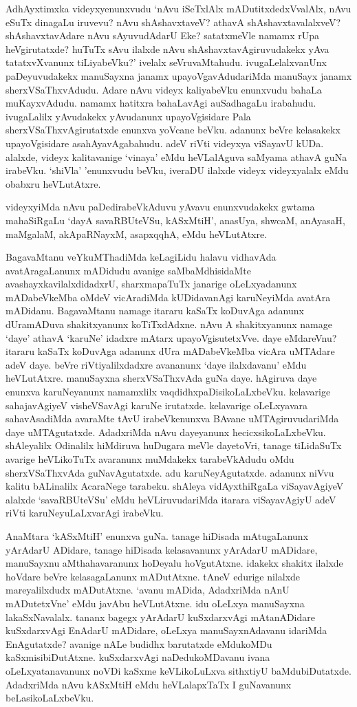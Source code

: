 AdhAyxtimxka videyxyenunxvudu `nAvu iSeTxlAlx mADutitxdedxVvalAlx, nAvu eSuTx dinagaLu iruvevu? nAvu shAshavxtaveV? athavA shAshavxtavalalxveV? shAshavxtavAdare 
nAvu sAyuvudAdarU Eke? satatxmeVle namamx rUpa heVgirutatxde? huTuTx sAvu ilalxde nAvu shAshavxtavAgiruvudakekx yAva 
tatatxvXvanunx tiLiyabeVku?' ivelalx seVruvaMtahudu. ivugaLelalxvanUnx paDeyuvudakekx manuSayxna janamx upayoVgavAdudariMda manuSayx 
janamx sherxVSaThxvAdudu. Adare nAvu videyx kaliyabeVku enunxvudu bahaLa muKayxvAdudu. namamx hatitxra bahaLavAgi auSadhagaLu irabahudu. 
ivugaLalilx yAvudakekx yAvudanunx upayoVgisidare Pala sherxVSaThxvAgirutatxde enunxva yoVcane beVku. adanunx beVre kelasakekx upayoVgisidare 
asahAyavAgabahudu. adeV riVti videyxya viSayavU kUDa. alalxde, videyx kalitavanige `vinaya' eMdu heVLalAguva saMyama athavA 
guNa irabeVku. `shiVla' 'enunxvudu beVku, iveraDU ilalxde videyx videyxyalalx eMdu obabxru heVLutAtxre.

videyxyiMda nAvu paDedirabeVkAduvu yAvavu enunxvudakekx gwtama mahaSiRgaLu `dayA savaRBUteVSu, kASxMtiH', anasUya, shwcaM, 
anAyasaH, maMgalaM, akApaRNayxM, asapxqqhA, eMdu heVLutAtxre.

BagavaMtanu veYkuMThadiMda keLagiLidu halavu vidhavAda avatAragaLanunx mADidudu avanige saMbaMdhisidaMte avashayxkavilalxdidadxrU, sharxmapaTuTx janarige 
oLeLxyadanunx mADabeVkeMba oMdeV vicAradiMda kUDidavanAgi karuNeyiMda avatAra mADidanu. BagavaMtanu namage itararu kaSaTx 
koDuvAga adanunx dUramADuva shakitxyanunx koTiTxdAdxne. nAvu A shakitxyanunx namage `daye' athavA `karuNe' idadxre mAtarx upayoVgisutetxVve. daye 
eMdareVnu? itararu kaSaTx koDuvAga adanunx dUra mADabeVkeMba vicAra uMTAdare adeV daye. beVre riVtiyalilxdadxre avananunx `daye ilalxdavanu' eMdu 
heVLutAtxre. manuSayxna sherxVSaThxvAda guNa daye. hAgiruva daye enunxva karuNeyanunx namamxlilx vaqdidhxpaDisikoLaLxbeVku. kelavarige sahajavAgiyeV 
visheVSavAgi karuNe irutatxde. kelavarige oLeLxyavara sahavAsadiMda avaraMte tAvU irabeVkenunxva BAvane uMTAgiruvudariMda daye 
uMTAgutatxde. AdadxriMda nAvu dayeyanunx hecicxsikoLaLxbeVku. shAleyalilx Odinalilx hiMdiruva huDugara meVle dayetoVri, tanage tiLidaSuTx 
avarige heVLikoTuTx avaranunx muMdakekx tarabeVkAdudu oMdu sherxVSaThxvAda guNavAgutatxde. adu karuNeyAgutatxde. adanunx niVvu kalitu bALinalilx 
AcaraNege tarabeku. shAleya vidAyxthiRgaLa viSayavAgiyeV alalxde `savaRBUteVSu' eMdu heVLiruvudariMda itarara viSayavAgiyU adeV riVti karuNeyuLaLxvarAgi irabeVku. 

AnaMtara `kASxMtiH' enunxva guNa. tanage hiDisada mAtugaLanunx yArAdarU ADidare, tanage hiDisada kelasavanunx yArAdarU 
mADidare, manuSayxnu aMthahavaranunx hoDeyalu hoVgutAtxne. idakekx shakitx ilalxde hoVdare beVre kelasagaLanunx mADutAtxne. 
tAneV edurige nilalxde mareyalilxdudx mADutAtxne. `avanu mADida, AdadxriMda nAnU mADutetxVne' eMdu javAbu heVLutAtxne. idu oLeLxya 
manuSayxna lakaSxNavalalx. tananx bagegx yArAdarU kuSxdarxvAgi mAtanADidare kuSxdarxvAgi EnAdarU mADidare, oLeLxya manuSayxnAdavanu idariMda 
EnAgutatxde? avanige nALe budidhx barutatxde eMdukoMDu kaSxmisibiDutAtxne. kuSxdarxvAgi naDedukoMDavanu ivana oLeLxyatanavanunx noVDi 
kaSxme keVLikoLuLxva sithxtiyU baMdubiDutatxde. AdadxriMda nAvu kASxMtiH eMdu heVLalapxTaTx I guNavanunx beLasikoLaLxbeVku.

